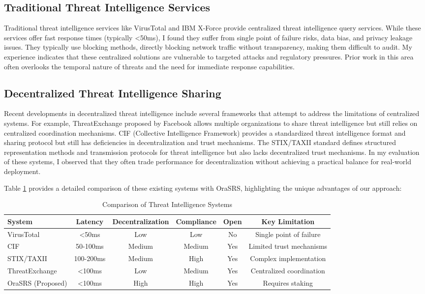 \documentclass[12pt]{article}
\begin{document}
\subsection{Traditional Threat Intelligence Services}
Traditional threat intelligence services like VirusTotal and IBM X-Force provide centralized threat intelligence query services. While these services offer fast response times (typically <50ms), I found they suffer from single point of failure risks, data bias, and privacy leakage issues. They typically use blocking methods, directly blocking network traffic without transparency, making them difficult to audit. My experience indicates that these centralized solutions are vulnerable to targeted attacks and regulatory pressures. Prior work in this area often overlooks the temporal nature of threats and the need for immediate response capabilities.

\subsection{Decentralized Threat Intelligence Sharing}
Recent developments in decentralized threat intelligence include several frameworks that attempt to address the limitations of centralized systems. For example, ThreatExchange proposed by Facebook allows multiple organizations to share threat intelligence but still relies on centralized coordination mechanisms. CIF (Collective Intelligence Framework) provides a standardized threat intelligence format and sharing protocol but still has deficiencies in decentralization and trust mechanisms. The STIX/TAXII standard defines structured representation methods and transmission protocols for threat intelligence but also lacks decentralized trust mechanisms. In my evaluation of these systems, I observed that they often trade performance for decentralization without achieving a practical balance for real-world deployment.

Table \ref{tab:related_work_comparison} provides a detailed comparison of these existing systems with OraSRS, highlighting the unique advantages of our approach:

\begin{table}[H]
\centering
\begin{tabular}{@{}lccccc@{}}
\toprule
\textbf{System} & \textbf{Latency} & \textbf{Decentralization} & \textbf{Compliance} & \textbf{Open} & \textbf{Key Limitation} \\
\midrule
VirusTotal & <50ms & Low & Low & No & Single point of failure \\
CIF & 50-100ms & Medium & Medium & Yes & Limited trust mechanisms \\
STIX/TAXII & 100-200ms & Medium & High & Yes & Complex implementation \\
ThreatExchange & <100ms & Low & Medium & Yes & Centralized coordination \\
OraSRS (Proposed) & <100ms & High & High & Yes & Requires staking \\
\bottomrule
\end{tabular}
\caption{Comparison of Threat Intelligence Systems}
\label{tab:related_work_comparison}
\end{table}
\end{document}
